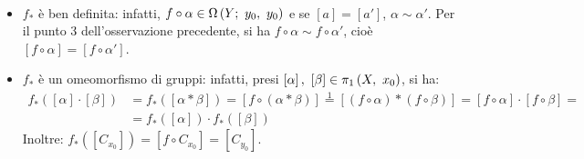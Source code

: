 \begin{demonstration}~{}
	\begin{itemize}
		\item $f_{\ast}$ è ben definita: infatti, $f\circ\alpha\in\Omega\left(Y;\ y_0,\ y_0\right)$ e se $\left[a\right]=\left[a'\right]$, $\alpha\sim\alpha'$. Per il punto 3 dell'osservazione precedente, si ha $f\circ \alpha\sim f\circ\alpha'$, cioè $\left[f\circ \alpha\right]=\left[f\circ\alpha'\right]$.
		\item $f_{\ast}$ è un omeomorfismo di gruppi: infatti, presi $\left[\alpha\right],\ \left[\beta\right]\in\gruf{X}{x_0}$, si ha:
		\begin{align*}
			f_{\ast}\left(\left[\alpha\right]\cdot\left[\beta\right]\right)&=f_{\ast}\left(\left[\alpha\ast\beta\right]\right)=\left[f\circ\left(\alpha\ast\beta\right)\right]\stackrel{1}{=}\left[\left(f\circ\alpha\right)\ast\left(f\circ\beta\right)\right]=\left[f\circ\alpha\right]\cdot\left[f\circ\beta\right]=\\&=f_{\ast}\left(\left[\alpha\right]\right)\cdot f_{\ast}\left(\left[\beta\right]\right)
		\end{align*}
	Inoltre: $f_{\ast}\left(\left[C_{x_0}\right]\right)=\left[f\circ C_{x_0}\right]=\left[C_{y_0}\right]$.
	\end{itemize}
\end{demonstration}
